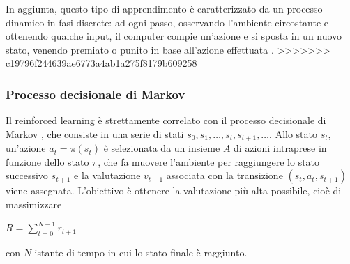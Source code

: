 \documentclass[../main.tex]{subfiles}
\begin{document}
In aggiunta, questo tipo di apprendimento è caratterizzato da un processo dinamico in fasi discrete: ad ogni passo, osservando l'ambiente circostante e ottenendo qualche input, il computer compie un'azione e si sposta in un nuovo stato, venendo premiato o punito in base all'azione effettuata \cite{compIntelligence}.
>>>>>>> c19796f244639ae6773a4ab1a275f8179b609258

\subsubsection{Processo decisionale di Markov}
Il reinforced learning è strettamente correlato con il processo decisionale di Markov \cite{compIntelligence}, che consiste in una serie di stati $s _ { 0 } , s _ { 1 } , \ldots , s _ { t } , s _ { t + 1 } , \ldots$. Allo stato ${ s } _ { t }$, un'azione $a _ { t } = \pi \left( s _ { t } \right)$ è selezionata da un insieme $A$ di azioni intraprese in funzione dello stato $\pi$, che fa muovere l'ambiente per raggiungere lo stato successivo $s _ { t  + 1}$ e la valutazione $v _ {t + 1}$ associata con la transizione $\left( s _ { t } , a _ { t } , s _ { t + 1 } \right)$ viene assegnata. L'obiettivo è ottenere la valutazione più alta possibile, cioè di massimizzare 

\begin{center}
				\begin{math}
								R = \sum _ { t = 0 } ^ { N - 1 } r _ { t + 1 }
				\end{math}
\end{center}

con $N$ istante di tempo in cui lo stato finale è raggiunto.
\end{document}
